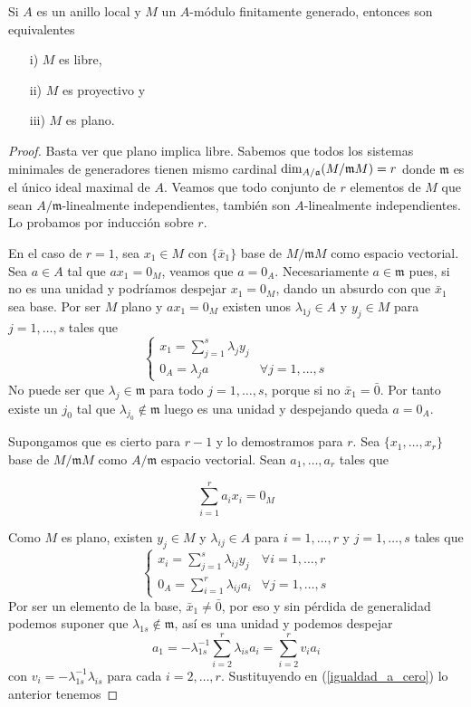 \documentclass[../main.tex]{subfiles}
\begin{document}
\begin{theorem}
	Si $A$ es un anillo local y $M$ un $A$-módulo finitamente generado, entonces son equivalentes
	\begin{itemize}
		\item[i)] $M$ es libre,
		\item[ii)] $M$ es proyectivo y
		\item[iii)] $M$ es plano.
	\end{itemize}
\end{theorem}
\begin{proof}

Basta ver que plano implica libre. Sabemos que todos los sistemas minimales de generadores tienen mismo cardinal $\dim_{A/\mathfrak{a}}(M/\mathfrak{m}M) = r$ donde $\mathfrak{m}$ es el único ideal maximal de $A$. Veamos que todo conjunto de $r$ elementos de $M$ que sean $A/\mathfrak{m}$-linealmente independientes, también son $A$-linealmente independientes. Lo probamos por inducción sobre $r$.

En el caso de $r=1$, sea $x_1 \in M$ con $\{\bar x_1\}$ base de $M/\mathfrak{m}M$ como espacio vectorial. Sea $a\in A$ tal que $ax_1 = 0_M$, veamos que $a = 0_A$. Necesariamente $a \in \mathfrak{m}$ pues, si no es una unidad y podríamos despejar $x_1 = 0_M$, dando un absurdo con que $\bar x_1$ sea base.
Por ser $M$ plano y $ax_1 = 0_M$ existen unos $\lambda_{1j} \in A$ y $y_j \in M$ para $j=1,\dots, s$ tales que
$$
\begin{cases}
	x_1 = \sum_{j=1}^s\lambda_j y_j \\
	0_A = \lambda_j a & \forall j=1,\dots, s
\end{cases}
$$
No puede ser que $\lambda_j \in \mathfrak{m}$ para todo $j=1,\dots, s$, porque si no $\bar x_1 = \bar 0$. Por tanto existe un $j_0$ tal que $\lambda_{j_0}\not \in \mathfrak{m}$ luego es una unidad y despejando queda $a = 0_A$.

Supongamos que es cierto para $r-1$ y lo demostramos para $r$. Sea $\{x_1, \dots, x_r\}$ base de $M/\mathfrak{m}M$ como $A/\mathfrak{m}$ espacio vectorial. Sean $a_1, \dots, a_r$  tales que

\begin{equation}\label{igualdad_a_cero}
	 \sum_{i=1}^r a_i x_i = 0_M
\end{equation}

Como $M$ es plano, existen $y_j \in M$ y $\lambda_{ij}\in A$ para $i = 1, \dots, r$ y $j=1, \dots, s$ tales que
$$
\begin{cases}
	x_i = \sum_{j=1}^s\lambda_{ij} y_j & \forall i= 1, \dots, r\\
	0_A = \sum_{i=1}^r \lambda_{ij} a_i & \forall j=1,\dots, s
\end{cases}
$$
Por ser un elemento de la base, $\bar x_1 \neq \bar 0$, por eso y sin pérdida de generalidad podemos suponer que $\lambda_{1s}\not \in \mathfrak{m}$, así es una  unidad y podemos despejar
\begin{equation}\label{despejado}
	a_1 = -\lambda_{1s}^{-1}\sum_{i=2}^r \lambda_{is} a_i = \sum_{i=2}^r v_ia_i
\end{equation}
con $v_i = -\lambda_{1s}^{-1}\lambda_{is}$ para cada $i=2,\dots, r$. Sustituyendo en (\ref{igualdad_a_cero}) lo anterior tenemos


\end{proof}
\end{document}

